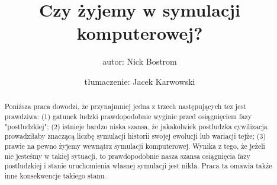 \documentclass[12pt]{article}
\title{Czy żyjemy w symulacji komputerowej?}
\author{autor: Nick Bostrom}
\author{tłumaczenie: Jacek Karwowski}
\begin{document}
	\maketitle
	\begin{abstract}
		Poniższa praca dowodzi, że przynajmniej jedna z trzech następujących tez jest prawdziwa: (1) gatunek ludzki prawdopodobnie wyginie przed osiągnięciem fazy "postludzkiej"; (2) istnieje bardzo niska szansa, że jakakolwiek postludzka cywilizacja prowadziłaby znaczącą liczbę symulacji historii swojej ewolucji lub wariacji tejże; (3) prawie na pewno żyjemy wewnątrz symulacji komputerowej. Wynika z tego, że jeżeli nie jesteśmy w takiej sytuacji, to prawdopodobnie nasza szansa osiągnięcia fazy postludzkiej i stanie uruchomienia własnej symulacji jest nikła. Praca ta omawia także inne konsekwencje takiego stanu.
	\end{abstract}
\end{document}
